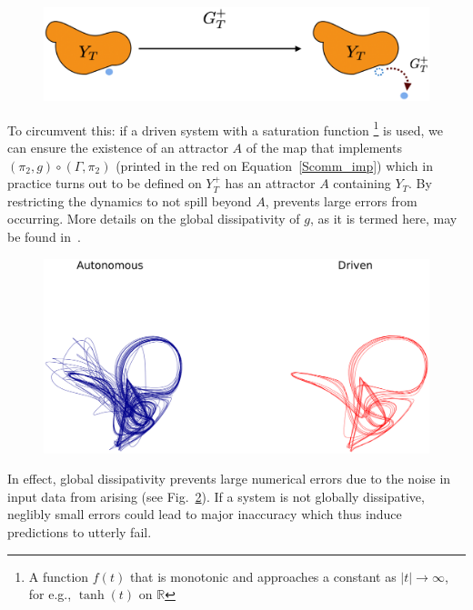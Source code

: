 \begin{figure}[ht]
  \includegraphics[width=0.6\linewidth]{Graphs/_YTerrors.eps}
  \centering
\label{fig:YtGtFailure}
\end{figure}

To circumvent this: if a driven system with a saturation function \footnote{A function $f(t)$ that is monotonic and approaches a constant as $|t|\to \infty$, for e.g., $\tanh(t)$ on $\mathbb{R}$} is used, we can ensure the existence of an attractor $A$ of the map that implements 
$(\pi_2,g) \circ (\Gamma,\pi_2)$ (printed in the red on Equation~\ref{Scomm_imp})
 which in practice turns out to be defined on $Y_T^+$ has an attractor $A$  containing $Y_T$.
By restricting the dynamics to not spill beyond $A$, prevents large errors from occurring.  
More details on the global dissipativity of $g$, as it is termed here, may be found in~\cite{Supp}.
\begin{figure}[ht]
  \includegraphics[scale=0.25]{Graphs/_autovsdriven.eps}
  \centering
 \label{fig:learningFailure}
\end{figure}

In effect, global dissipativity prevents large numerical errors due to the noise in input data from arising (see Fig.~\ref{fig:learningFailure}). 
If a system is not globally dissipative, neglibly small errors could lead to major inaccuracy which thus induce predictions to utterly fail.


